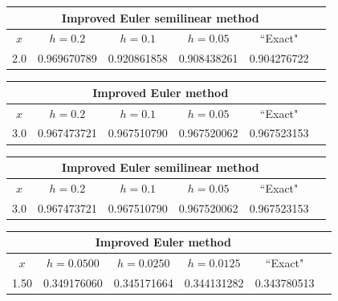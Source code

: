 \bigskip

\hspace{.75in}
{\small
\begin{tabular}{|c|r|r|r|r|r|}
\hline
\multicolumn{5}{|c|}{Improved Euler semilinear method}\\\hline
\multicolumn{1}{|c|}{$x$}&
\multicolumn{1}{|c|}{$h=0.2$}&
\multicolumn{1}{|c|}{$h=0.1$}&
\multicolumn{1}{|c|}{$h=0.05$}&
\multicolumn{1}{|c|}{``Exact"}\\ \hline
2.0 & 0.969670789 & 0.920861858 & 0.908438261 & 0.904276722 \\
\hline
\end{tabular}}

\bigskip

{\small
\begin{tabular}{|c|r|r|r|r|r|}
\hline
\multicolumn{5}{|c|}{Improved Euler method}\\\hline
\multicolumn{1}{|c|}{$x$}&
\multicolumn{1}{|c|}{$h=0.2$}&
\multicolumn{1}{|c|}{$h=0.1$}&
\multicolumn{1}{|c|}{$h=0.05$}&
\multicolumn{1}{|c|}{``Exact"}\\ \hline
3.0 & 0.967473721 & 0.967510790 & 0.967520062 & 0.967523153 \\
\hline
\end{tabular}}

\bigskip

\hspace{.75in}
{\small
\begin{tabular}{|c|r|r|r|r|r|}
\hline
\multicolumn{5}{|c|}{Improved Euler semilinear method}\\
\hline
\multicolumn{1}{|c|}{$x$}&
\multicolumn{1}{|c|}{$h=0.2$}&
\multicolumn{1}{|c|}{$h=0.1$}&
\multicolumn{1}{|c|}{$h=0.05$}&
\multicolumn{1}{|c|}{``Exact"}\\ \hline
3.0 & 0.967473721 & 0.967510790 & 0.967520062 & 0.967523153 \\
\hline
\end{tabular}}

\bigskip

\small{
\begin{tabular}{|c|r|r|r|r|r|}
\hline
\multicolumn{5}{|c|}{Improved Euler method}\\\hline
\multicolumn{1}{|c|}{$x$}&
\multicolumn{1}{|c|}{$h=0.0500$}&
\multicolumn{1}{|c|}{$h=0.0250$}&
\multicolumn{1}{|c|}{$h=0.0125$}&
\multicolumn{1}{|c|}{``Exact"}\\ \hline
1.50 &0.349176060  & 0.345171664 & 0.344131282 & 0.343780513 \\
\hline
\end{tabular}}

